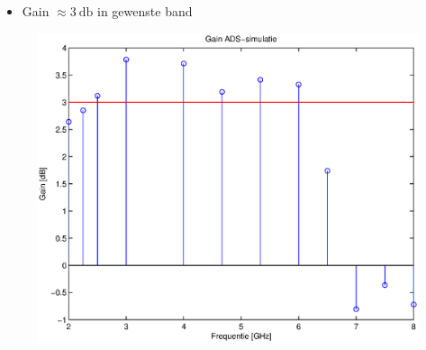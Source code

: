 \documentclass{beamer}
\begin{document}
\begin{frame}
\begin{columns}[c]
      \begin{column}{0.5\textwidth}
      \begin{itemize}
        \item Gain $\approx \SI{3}{\decibel}$ in gewenste band 
      \end{itemize}
        \begin{figure}
          \includegraphics[width=\textwidth]{images/gain_ADS_sim.eps}
        \end{figure}
      \end{column}
    \end{columns}
  \end{frame}
\end{document}
